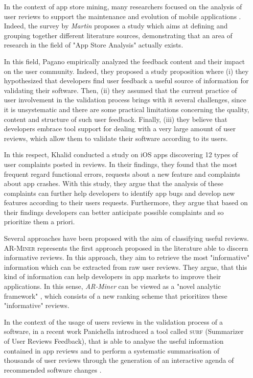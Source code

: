 In the context of app store mining, many researchers focused on the analysis of user reviews to support the maintenance and evolution of mobile applications \cite{Martin:tse2017}.
Indeed, the survey by \textit{Martin} \etal \cite{Martin:tse2017} proposes a study which aims at defining and grouping together different literature sources, demonstrating that an area of research in the field of "App Store Analysis" actually exists.

In this field, Pagano \etal \cite{pagano} empirically analyzed the feedback content and their impact on the user community. 
Indeed, they proposed a study proposition where (i) they hypothesized that developers find user feedback a useful source of information for validating their software. Then, (ii) they assumed that the current practice of user involvement in the validation process brings with it several challenges, since it is unsystematic and there are some practical limitations concerning the quality, content and structure of such user feedback. 
Finally, (iii) they believe that developers embrace tool support for dealing with a very large amount of user reviews, which allow them to validate their software according to its users. 

In this respect, Khalid \etal \cite{Khalid:2015:IEEE} conducted a study on iOS apps discovering 12 types of user complaints posted in reviews. 
In their findings, they found that the most frequent regard functional errors, requests about a new feature and complaints about app crashes. With this study, they argue that the analysis of these complaints can further help developers to identify app bugs and develop new features according to their users requests. 
Furthermore, they argue that based on their findings developers can better anticipate possible complaints and so prioritize them a priori.    

Several approaches have been proposed with the aim of classifying useful reviews.
\textsc{AR-Miner} \cite{Chen} represents the first approach proposed in the literature able to discern informative reviews. 
In this approach, they aim to retrieve the most "informative" information which can be extracted from raw user reviews. They argue, that this kind of information can help developers in app markets to improve their applications. In this sense, \textit{AR-Miner} can be viewed as a "novel analytic framework" \cite{Chen}, which consists of a new ranking scheme that prioritizes these "informative" reviews. 

In the context of the usage of users reviews in the validation process of a software, in a recent work Panichella \etal introduced a tool called \textsc{surf} (Summarizer of User Reviews Feedback), that is able to analyse the useful information contained in app reviews and to perform a systematic summarisation of thousands of user reviews through the generation of an interactive agenda of recommended software changes 
\cite{sorbo}. 

